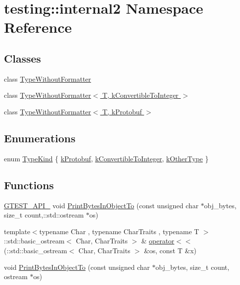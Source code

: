 \hypertarget{namespacetesting_1_1internal2}{}\section{testing\+:\+:internal2 Namespace Reference}
\label{namespacetesting_1_1internal2}
\subsection*{Classes}
\begin{DoxyCompactItemize}
\item 
class \hyperlink{classtesting_1_1internal2_1_1_type_without_formatter}{Type\+Without\+Formatter}
\item 
class \hyperlink{classtesting_1_1internal2_1_1_type_without_formatter_3_01_t_00_01k_convertible_to_integer_01_4}{Type\+Without\+Formatter$<$ T, k\+Convertible\+To\+Integer $>$}
\item 
class \hyperlink{classtesting_1_1internal2_1_1_type_without_formatter_3_01_t_00_01k_protobuf_01_4}{Type\+Without\+Formatter$<$ T, k\+Protobuf $>$}
\end{DoxyCompactItemize}
\subsection*{Enumerations}
\begin{DoxyCompactItemize}
\item 
enum \hyperlink{namespacetesting_1_1internal2_aeb8161b0b3ee503347b0662d7028fd57}{Type\+Kind} \{ \hyperlink{namespacetesting_1_1internal2_aeb8161b0b3ee503347b0662d7028fd57a14aaf98a2547ecf43eef0868d54b1383}{k\+Protobuf}, 
\hyperlink{namespacetesting_1_1internal2_aeb8161b0b3ee503347b0662d7028fd57a9bdcf3f1548f498b2b7f097306ea0224}{k\+Convertible\+To\+Integer}, 
\hyperlink{namespacetesting_1_1internal2_aeb8161b0b3ee503347b0662d7028fd57abe8aaea44751d6ebd0cdf5bd94451db1}{k\+Other\+Type}
 \}
\end{DoxyCompactItemize}
\subsection*{Functions}
\begin{DoxyCompactItemize}
\item 
\hyperlink{gtest-port_8h_aa73be6f0ba4a7456180a94904ce17790}{G\+T\+E\+S\+T\+\_\+\+A\+P\+I\+\_\+} void \hyperlink{namespacetesting_1_1internal2_a04a384ee5de3a9f4f00a6052ea79b495}{Print\+Bytes\+In\+Object\+To} (const unsigned char $\ast$obj\+\_\+bytes, size\+\_\+t count,\+::std\+::ostream $\ast$os)
\item 
{\footnotesize template$<$typename Char , typename Char\+Traits , typename T $>$ }\\\+::std\+::basic\+\_\+ostream$<$ Char, Char\+Traits $>$ \& \hyperlink{namespacetesting_1_1internal2_a07dbe129beb8952074f04b599dfce39b}{operator$<$$<$} (\+::std\+::basic\+\_\+ostream$<$ Char, Char\+Traits $>$ \&os, const T \&x)
\item 
void \hyperlink{namespacetesting_1_1internal2_abfb9aa80365f93b952e9a4bea09947a8}{Print\+Bytes\+In\+Object\+To} (const unsigned char $\ast$obj\+\_\+bytes, size\+\_\+t count, ostream $\ast$os)
\end{DoxyCompactItemize}
